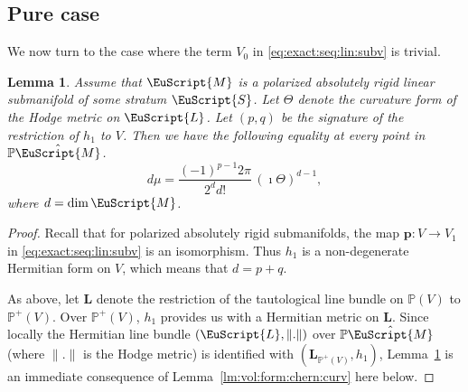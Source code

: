 \documentclass[10pt]{amsart}
\let\mathcal\EuScript
\theoremstyle{plain}
\newtheorem{Lemma}[Theorem]{Lemma}
\theoremstyle{definition}
\newcommand{\Pb}{\mathbb{P}}
\newcommand{\Lb}{\mathbf{L}}
\newcommand{\pp}{\boldsymbol{p}}
\newcommand{\cL}{\mathcal{L}}
\newcommand{\cM}{\mathcal{M}}
\newcommand{\cS}{\mathcal{S}}
\begin{document}
\subsection{Pure case}\label{sec:vol:form:pure}
We now turn to the case where the term $V_0$ in \eqref{eq:exact:seq:lin:subv} is trivial.
\begin{Lemma}\label{lm:vol:form:n:Chern:cl}
Assume that $\cM$ is a polarized absolutely rigid linear submanifold of some stratum $\cS$.
Let $\Theta$ denote the curvature form of the Hodge metric on $\cL$.
Let $(p,q)$ be the signature of the restriction of $h_1$ to $V$.
Then we have the following equality at every point in $\Pb\hat{\cM}$.
\[ d\mu=\frac{(-1)^{p-1}2\pi}{2^dd!}\,(\imath\Theta)^{d-1},\]
where $d=\dim\cM$.
\end{Lemma}
\begin{proof}
Recall that for polarized absolutely rigid submanifolds, the map $\pp:V \to V_1$ in \eqref{eq:exact:seq:lin:subv} is an isomorphism.
Thus $h_1$ is a non-degenerate Hermitian form on $V$, which means that $d=p+q$.

As above, let $\Lb$ denote the restriction of the tautological line bundle on $\Pb(V)$ to $\Pb^+(V)$. Over $\Pb^+(V)$, $h_1$ provides us with a Hermitian metric on $\Lb$.
Since locally the Hermitian line bundle $(\cL,\|.\|)$ over $\Pb\hat{\cM}$ (where $\|.\|$ is the Hodge metric) is identified with $(\Lb_{\Pb^+(V)},h_1)$, Lemma~\ref{lm:vol:form:n:Chern:cl} is an immediate consequence of Lemma~\ref{lm:vol:form:chern:curv} here below.
\end{proof}
\end{document}
